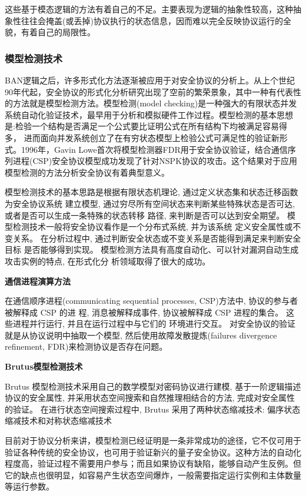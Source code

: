 这些基于模态逻辑的方法有着自己的不足。主要表现为逻辑的抽象性较高，这种抽象性往往会掩盖(或丢掉)协议执行的状态信息，因而难以完全反映协议运行的全貌，有着自己的局限性。


\subsubsection{模型检测技术}

BAN逻辑之后，许多形式化方法逐渐被应用于对安全协议的分析上。从上个世纪90年代起，安全协议的形式化分析研究出现了空前的繁荣景象，其中一种有代表性的方法就是模型检测方法。模型检测(model checking)是一种强大的有限状态并发系统自动化验证技术，最早用于分析和模拟硬件工作过程。模型检测的基本思想是:检验一个结构是否满足一个公式要比证明公式在所有结构下均被满足容易得多，
进而面向并发系统创立了在有穷状态模型上检验公式可满足性的验证新形式。1996年，Gavin Lowe首次将模型检测器FDR用于安全协议验证，结合通信序列进程(CSP)安全协议模型成功发现了针对NSPK协议的攻击。这个结果对于应用模型检测的方法分析安全协议有着典型意义。


模型检测技术的基本思路是根据有限状态机理论, 通过定义状态集和状态迁移函数为安全协议系统
建立模型, 通过穷尽所有空间状态来判断某些特殊状态是否可达, 或者是否可以生成一条特殊的状态转移
路径, 来判断是否可以达到安全期望。 模型检测技术一般将安全协议看作是一个分布式系统, 并为该系统
定义安全属性或不变关系。 在分析过程中, 通过判断安全状态或不变关系是否能得到满足来判断安全目标
是否能够得到实现。 模型检测方法具有高度自动化、可以针对漏洞自动生成攻击实例的特点, 在形式化分
析领域取得了很大的成功。


\textbf{通信进程演算方法}

在通信顺序进程(communicating sequential processes, CSP)方法中, 协议的参与者被解释成 CSP 的进
程, 消息被解释成事件, 协议被解释成 CSP 进程的集合。 这些进程并行运行, 并且在运行过程中与它们的
环境进行交互。 对安全协议的验证就是从协议说明中抽取一个模型, 然后使用故障发散提炼(failures
divergence refinement, FDR)来检测协议是否存在问题。

\textbf{Brutus模型检测技术}

Brutus 模型检测技术采用自己的数学模型对密码协议进行建模, 基于一阶逻辑描述协议的安全属性,
并采用状态空间搜索和自然推理相结合的方法, 完成对安全属性的验证。 在进行状态空间搜索过程中,
Brutus 采用了两种状态缩减技术: 偏序状态缩减技术和对称状态缩减技术

目前对于协议分析来讲，模型检测已经证明是一条非常成功的途径，它不仅可用于验证各种传统的安全协议，也可用于验证新兴的量子安全协议。这种方法的自动化程度高，验证过程不需要用户参与；而且如果协议有缺陷，能够自动产生反例。但它的缺点也很明显，如容易产生状态空间爆炸，一般需要指定运行实例和主体数量等运行参数。

